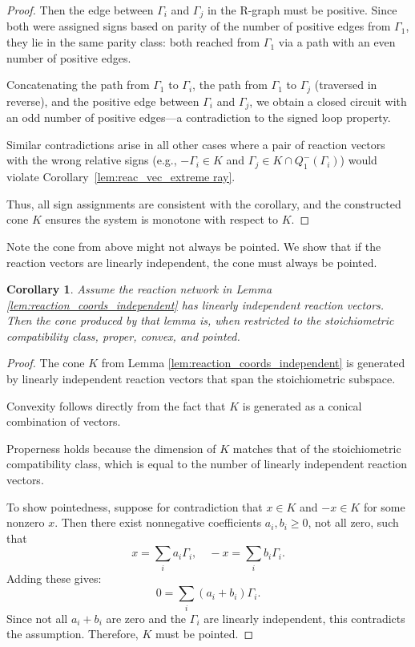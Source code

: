 \documentclass{article}
\newtheorem{cor}{Corollary}
\begin{document}
\begin{proof}
Then the edge between \( \Gamma_i \) and \( \Gamma_j \) in the R-graph must be positive. Since both were assigned signs based on parity of the number of positive edges from \( \Gamma_1 \), they lie in the same parity class: both reached from \( \Gamma_1 \) via a path with an even number of positive edges.

Concatenating the path from \( \Gamma_1 \) to \( \Gamma_i \), the path from \( \Gamma_1 \) to \( \Gamma_j \) (traversed in reverse), and the positive edge between \( \Gamma_i \) and \( \Gamma_j \), we obtain a closed circuit with an odd number of positive edges—a contradiction to the signed loop property.

Similar contradictions arise in all other cases where a pair of reaction vectors with the wrong relative signs (e.g., \( -\Gamma_i \in K \) and \( \Gamma_j \in K \cap Q_1^-(\Gamma_i) \)) would violate Corollary~\ref{lem:reac_vec_extreme ray}.

Thus, all sign assignments are consistent with the corollary, and the constructed cone \( K \) ensures the system is monotone with respect to \( K \).
\end{proof}


Note the cone from above might not always be pointed. We show that if the reaction vectors are linearly independent, the cone must always be pointed.


\begin{cor}
Assume the reaction network in Lemma \ref{lem:reaction_coords_independent} has linearly independent reaction vectors. Then the cone produced by that lemma is, when restricted to the stoichiometric compatibility class, proper, convex, and pointed.
\end{cor}

\begin{proof}
The cone \( K \) from Lemma \ref{lem:reaction_coords_independent} is generated by linearly independent reaction vectors that span the stoichiometric subspace. 

Convexity follows directly from the fact that \( K \) is generated as a conical combination of vectors.

Properness holds because the dimension of \( K \) matches that of the stoichiometric compatibility class, which is equal to the number of linearly independent reaction vectors.

To show pointedness, suppose for contradiction that \( x \in K \) and \( -x \in K \) for some nonzero \( x \). Then there exist nonnegative coefficients \( a_i, b_i \geq 0 \), not all zero, such that
\[
x = \sum_i a_i \Gamma_i, \quad -x = \sum_i b_i \Gamma_i.
\]
Adding these gives:
\[
0 = \sum_i (a_i + b_i) \Gamma_i.
\]
Since not all \( a_i + b_i \) are zero and the \( \Gamma_i \) are linearly independent, this contradicts the assumption. Therefore, \( K \) must be pointed.
\end{proof}
\end{document}
